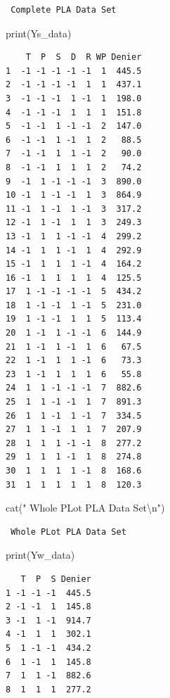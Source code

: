 \documentclass[
  letterpaper,
  DIV=11,
  numbers=noendperiod]{scrartcl}
\newenvironment{Shaded}{\begin{snugshade}}{\end{snugshade}}
\newcommand{\FunctionTok}[1]{\textcolor[rgb]{0.28,0.35,0.67}{#1}}
\newcommand{\NormalTok}[1]{\textcolor[rgb]{0.00,0.23,0.31}{#1}}
\newcommand{\SpecialCharTok}[1]{\textcolor[rgb]{0.37,0.37,0.37}{#1}}
\newcommand{\StringTok}[1]{\textcolor[rgb]{0.13,0.47,0.30}{#1}}
\begin{document}
\begin{verbatim}
 Complete PLA Data Set
\end{verbatim}

\begin{Shaded}
\begin{Highlighting}[]
\FunctionTok{print}\NormalTok{(Ys\_data)}
\end{Highlighting}
\end{Shaded}

\begin{verbatim}
    T  P  S  D  R WP Denier
1  -1 -1 -1 -1 -1  1  445.5
2  -1 -1 -1 -1  1  1  437.1
3  -1 -1 -1  1 -1  1  198.0
4  -1 -1 -1  1  1  1  151.8
5  -1 -1  1 -1 -1  2  147.0
6  -1 -1  1 -1  1  2   88.5
7  -1 -1  1  1 -1  2   90.0
8  -1 -1  1  1  1  2   74.2
9  -1  1 -1 -1 -1  3  890.0
10 -1  1 -1 -1  1  3  864.9
11 -1  1 -1  1 -1  3  317.2
12 -1  1 -1  1  1  3  249.3
13 -1  1  1 -1 -1  4  299.2
14 -1  1  1 -1  1  4  292.9
15 -1  1  1  1 -1  4  164.2
16 -1  1  1  1  1  4  125.5
17  1 -1 -1 -1 -1  5  434.2
18  1 -1 -1  1 -1  5  231.0
19  1 -1 -1  1  1  5  113.4
20  1 -1  1 -1 -1  6  144.9
21  1 -1  1 -1  1  6   67.5
22  1 -1  1  1 -1  6   73.3
23  1 -1  1  1  1  6   55.8
24  1  1 -1 -1 -1  7  882.6
25  1  1 -1 -1  1  7  891.3
26  1  1 -1  1 -1  7  334.5
27  1  1 -1  1  1  7  207.9
28  1  1  1 -1 -1  8  277.2
29  1  1  1 -1  1  8  274.8
30  1  1  1  1 -1  8  168.6
31  1  1  1  1  1  8  120.3
\end{verbatim}

\begin{Shaded}
\begin{Highlighting}[]
\FunctionTok{cat}\NormalTok{(}\StringTok{" Whole PLot PLA Data Set}\SpecialCharTok{\textbackslash{}n}\StringTok{"}\NormalTok{)}
\end{Highlighting}
\end{Shaded}

\begin{verbatim}
 Whole PLot PLA Data Set
\end{verbatim}

\begin{Shaded}
\begin{Highlighting}[]
\FunctionTok{print}\NormalTok{(Yw\_data)}
\end{Highlighting}
\end{Shaded}

\begin{verbatim}
   T  P  S Denier
1 -1 -1 -1  445.5
2 -1 -1  1  145.8
3 -1  1 -1  914.7
4 -1  1  1  302.1
5  1 -1 -1  434.2
6  1 -1  1  145.8
7  1  1 -1  882.6
8  1  1  1  277.2
\end{verbatim}
\end{document}
